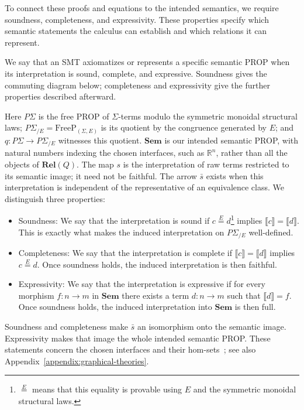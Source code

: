    
To connect these proofs and equations to the intended semantics, we require soundness,
completeness, and expressivity. These properties specify which semantic
statements the calculus can establish and which relations it can represent.

\begin{definition}
	We say that an SMT axiomatizes or represents a specific semantic PROP when its interpretation is sound, complete, and expressive. Soundness gives the commuting diagram below; completeness and expressivity give the further properties described afterward.
	\begin{figure}[H]
		\centering
		
	\end{figure}
	Here $P\Sigma$ is the free PROP of $\Sigma$-terms modulo the symmetric monoidal structural laws; $P\Sigma_{/E} = \text{FreeP}_{(\Sigma,E)}$ is its quotient by the congruence generated by $E$; and $q : P\Sigma \to P\Sigma_{/E}$ witnesses this quotient. $\mathbf{Sem}$ is our intended semantic PROP, with natural numbers indexing the chosen interfaces, such as $\mathbb{R}^n$, rather than all the objects of $\mathbf{Rel}(Q)$. The map $s$ is the interpretation of raw terms restricted to its semantic image; it need not be faithful. The arrow $\bar{s}$ exists when this interpretation is independent of the representative of an equivalence class. We distinguish three properties:
	\begin{itemize}
		\item Soundness: We say that the interpretation is sound if $c \overset{E}= d$\footnote{$\overset{E}=$ means that this equality is provable using $E$ and the symmetric monoidal structural laws.} implies $\llbracket c\rrbracket = \llbracket d\rrbracket$. This is exactly what makes the induced interpretation on $P\Sigma_{/E}$ well-defined.
		\item Completeness: We say that the interpretation is complete if $\llbracket c\rrbracket = \llbracket d\rrbracket$ implies $c \overset{E}= d$. Once soundness holds, the induced interpretation is then faithful.
		\item Expressivity: We say that the interpretation is expressive if for every morphism $f:n\to m$ in $\mathbf{Sem}$ there exists a term $d:n\to m$ such that $\llbracket d\rrbracket = f$. Once soundness holds, the induced interpretation into $\mathbf{Sem}$ is then full.
	\end{itemize}
	Soundness and completeness make $\bar{s}$ an isomorphism onto the semantic image. Expressivity makes that image the whole intended semantic PROP. These statements concern the chosen interfaces and their hom-sets~\cite[Section~2.1]{bonchi2017interacting}; see also Appendix~\ref{appendix:graphical-theories}.
\end{definition}

